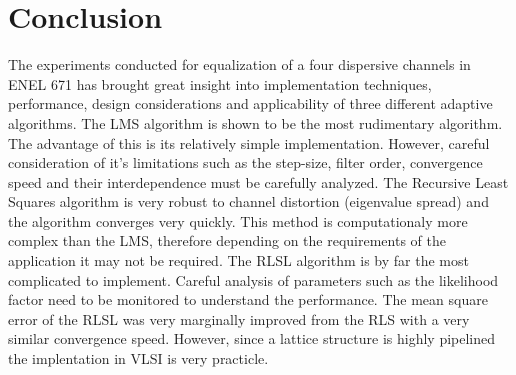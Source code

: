 \documentclass[journal]{IEEEtran}
\begin{document}
%




\section{Conclusion}
The experiments conducted for equalization of a four dispersive channels in ENEL 671
has brought great insight into implementation techniques, performance, design considerations
and applicability of three different adaptive algorithms. The LMS algorithm is shown to be
the most rudimentary algorithm. The advantage of this is its relatively simple implementation. However,
careful consideration of it's limitations such as the step-size, filter order, convergence speed and their interdependence must
be carefully analyzed. The Recursive Least Squares algorithm is very robust to channel distortion (eigenvalue spread) and the
algorithm converges very quickly. This method is computationaly more complex than the LMS, therefore depending
on the requirements of the application it may not be required. The RLSL algorithm is by far the most complicated to implement.
Careful analysis of parameters such as the likelihood factor need to be monitored to understand the performance. The mean square
error of the RLSL was very marginally improved from the RLS with a very similar convergence speed. However, since a lattice
structure is highly pipelined the implentation in VLSI is very practicle.
\end{document}
